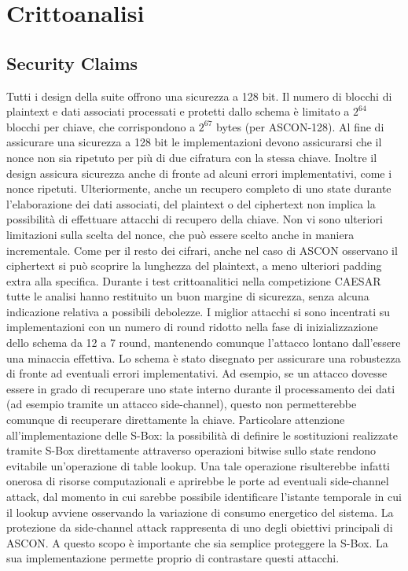 \section{Crittoanalisi}
\subsection{Security Claims}
Tutti i design della suite offrono una sicurezza a 128 bit. Il numero di blocchi di plaintext e dati associati processati e protetti dallo schema è limitato a $2^{64}$ blocchi per chiave, che corrispondono a $2^{67}$ bytes (per ASCON-128). Al fine di assicurare una sicurezza a 128 bit le implementazioni devono assicurarsi che il nonce non sia ripetuto per più di due cifratura con la stessa chiave. 
\newline\newline
Inoltre il design assicura sicurezza anche di fronte ad alcuni errori implementativi, come i nonce ripetuti. Ulteriormente, anche un recupero completo di uno state durante l'elaborazione dei dati associati, del plaintext o del ciphertext non implica la possibilità di effettuare attacchi di recupero della chiave. 
\newline\newline
Non vi sono ulteriori limitazioni sulla scelta del nonce, che può essere scelto anche in maniera incrementale. Come per il resto dei cifrari, anche nel caso di ASCON osservano il ciphertext si può scoprire la lunghezza del plaintext, a meno ulteriori padding extra alla specifica. 
\newline\newline
Durante i test crittoanalitici nella competizione CAESAR tutte le analisi hanno restituito un buon margine di sicurezza, senza alcuna indicazione relativa a possibili debolezze. I miglior attacchi si sono incentrati su implementazioni con un numero di round ridotto nella fase di inizializzazione dello schema da 12 a 7 round, mantenendo comunque l'attacco lontano dall'essere una minaccia effettiva. 
\newline\newline
Lo schema è stato disegnato per assicurare una robustezza di fronte ad eventuali errori implementativi. Ad esempio, se un attacco dovesse essere in grado di recuperare uno state interno durante il processamento dei dati (ad esempio tramite un attacco side-channel), questo non permetterebbe comunque di recuperare direttamente la chiave. 
\newline\newline
Particolare attenzione all'implementazione delle S-Box: la possibilità di definire le sostituzioni realizzate tramite S-Box direttamente attraverso operazioni bitwise sullo state rendono evitabile un'operazione di table lookup. Una tale operazione risulterebbe infatti onerosa di risorse computazionali e aprirebbe le porte ad eventuali side-channel attack, dal momento in cui sarebbe possibile identificare l'istante temporale in cui il lookup avviene osservando la variazione di consumo energetico del sistema. La protezione da side-channel attack rappresenta di uno degli obiettivi principali di ASCON. A questo scopo è importante che sia semplice proteggere la S-Box. La sua implementazione permette proprio di contrastare questi attacchi. 
